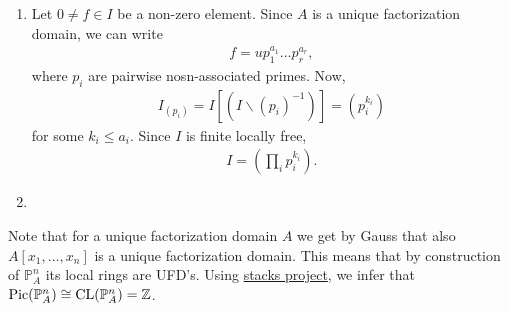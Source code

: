 \newcommand{\sheet}{8}




\maketitle{}

\begin{exercise}{1}
    \begin{enumerate}
        \item  Let $0\not = f \in I$ be a non-zero element. Since $A$ is a unique factorization domain,
        we can write 
        \begin{align*}
            f=u{p}_1^{a_1}\dots {p}_r^{a_r},
        \end{align*}
        where ${p}_i$ are pairwise nosn-associated primes.
        Now, 
        \begin{align*}
            I_({p}_i)=I[(I\backslash (p_i)^{-1})]=(p_i^{k_i})
        \end{align*}
        for some $k_i\leq a_i.$
        Since $I$ is finite locally free, 
        \begin{align*}
            I=(\prod_i p_i^{k_i}).
        \end{align*}
        \item 
    \end{enumerate}
\end{exercise}

\begin{exercise}{2}
    Note that for a unique factorization domain $A$ we get by Gauss that also $A[x_1,\dots, x_n]$ is a unique factorization domain.
    This means that by construction of $\mathbb{P}_A^n$ its local rings are UFD's. Using \href{https://stacks.math.columbia.edu/tag/0BE9}{stacks project},
    we infer that $\operatorname{Pic}(\mathbb{P}_A^n)\cong \operatorname{CL}(\mathbb{P}_A^n)=\mathbb{Z}$.
\end{exercise}

